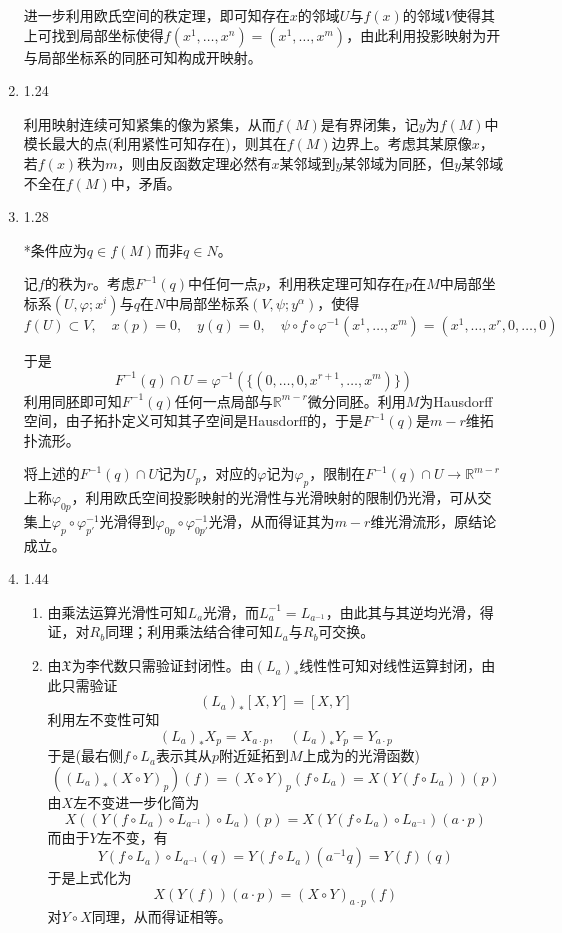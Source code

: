 \documentclass[a4paper,UTF8,fontset=windows,10pt]{ctexart}
\begin{document}
\begin{enumerate}
    进一步利用欧氏空间的秩定理，即可知存在$x$的邻域$U$与$f(x)$的邻域$V$使得其上可找到局部坐标使得$f(x^1,\dots,x^n)=(x^1,\dots,x^m)$，由此利用投影映射为开与局部坐标系的同胚可知构成开映射。
    
    \item 1.24
    
    利用映射连续可知紧集的像为紧集，从而$f(M)$是有界闭集，记$y$为$f(M)$中模长最大的点(利用紧性可知存在)，则其在$f(M)$边界上。考虑其某原像$x$，若$f(x)$秩为$m$，则由反函数定理必然有$x$某邻域到$y$某邻域为同胚，但$y$某邻域不全在$f(M)$中，矛盾。
    
    \item 1.28
    
    *条件应为$q\in f(M)$而非$q\in N$。
    
    记$f$的秩为$r$。考虑$F^{-1}(q)$中任何一点$p$，利用秩定理可知存在$p$在$M$中局部坐标系$(U,\varphi;x^i)$与$q$在$N$中局部坐标系$(V,\psi;y^\alpha)$，使得
    $$f(U)\subset V,\quad x(p)=0,\quad y(q)=0,\quad\psi\circ f\circ\varphi^{-1}(x^1,\dots,x^m)=(x^1,\dots,x^r,0,\dots,0)$$
    
    于是
    $$F^{-1}(q)\cap U=\varphi^{-1}(\{(0,\dots,0,x^{r+1},\dots,x^m)\})$$
    利用同胚即可知$F^{-1}(q)$任何一点局部与$\mathbb{R}^{m-r}$微分同胚。利用$M$为Hausdorff空间，由子拓扑定义可知其子空间是Hausdorff的，于是$F^{-1}(q)$是$m-r$维拓扑流形。
    
    将上述的$F^{-1}(q)\cap U$记为$U_p$，对应的$\varphi$记为$\varphi_p$，限制在$F^{-1}(q)\cap U\to\mathbb{R}^{m-r}$上称$\varphi_{0p}$，利用欧氏空间投影映射的光滑性与光滑映射的限制仍光滑，可从交集上$\varphi_p\circ\varphi_{p'}^{-1}$光滑得到$\varphi_{0p}\circ\varphi_{0p'}^{-1}$光滑，从而得证其为$m-r$维光滑流形，原结论成立。
    
    \item 1.44
    \begin{enumerate}[(1)]
        \item 由乘法运算光滑性可知$L_a$光滑，而$L_a^{-1}=L_{a^{-1}}$，由此其与其逆均光滑，得证，对$R_b$同理；利用乘法结合律可知$L_a$与$R_b$可交换。
        
        \item 由$\mathfrak{X}$为李代数只需验证封闭性。由$(L_a)_*$线性性可知对线性运算封闭，由此只需验证
        $$(L_a)_*[X,Y]=[X,Y]$$
        利用左不变性可知
        $$(L_a)_*X_p=X_{a\cdot p},\quad(L_a)_*Y_p=Y_{a\cdot p}$$
        于是(最右侧$f\circ L_a$表示其从$p$附近延拓到$M$上成为的光滑函数)
        $$((L_a)_*(X\circ Y)_p)(f)=(X\circ Y)_p(f\circ L_a)=X(Y(f\circ L_a))(p)$$
        由$X$左不变进一步化简为
        $$X((Y(f\circ L_a)\circ L_{a^{-1}})\circ L_a)(p)=X(Y(f\circ L_a)\circ L_{a^{-1}})(a\cdot p)$$
        而由于$Y$左不变，有
        $$Y(f\circ L_a)\circ L_{a^{-1}}(q)=Y(f\circ L_a)(a^{-1}q)=Y(f)(q)$$
        于是上式化为
        $$X(Y(f))(a\cdot p)=(X\circ Y)_{a\cdot p}(f)$$
        对$Y\circ X$同理，从而得证相等。
    

\end{enumerate}
\end{enumerate}
\end{document}

